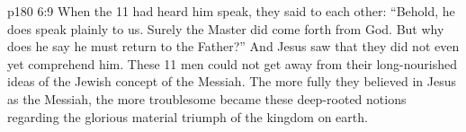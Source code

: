 \vs p180 6:9 When the 11 had heard him speak, they said to each other: “Behold, he does speak plainly to us. Surely the Master did come forth from God. But why does he say he must return to the Father?” And Jesus saw that they did not even yet comprehend him. These 11 men could not get away from their long\hyp{}nourished ideas of the Jewish concept of the Messiah. The more fully they believed in Jesus as the Messiah, the more troublesome became these deep\hyp{}rooted notions regarding the glorious material triumph of the kingdom on earth.
\quizlink
